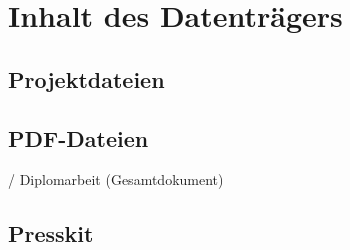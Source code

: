 \chapter{Inhalt des Datenträgers}

\section{Projektdateien}

\section{PDF-Dateien} %
\begin{FileList}{/}
	 Diplomarbeit (Gesamtdokument) 
\end{FileList}
 

\section{Presskit} %
